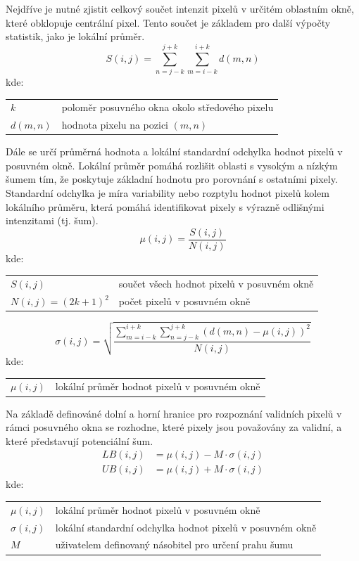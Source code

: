 \documentclass[male,czech,api_ing]{thesis}
\makeatletter
\newenvironment{conditions}[1][kde:]
    {#1 \begin{tabular}[t]{>{$}l<{$} @{${}={}$} >{\raggedright\arraybackslash}p{10cm}}}
    {\end{tabular}}
\makeatother
\begin{document}
Nejdříve je nutné zjistit celkový součet intenzit pixelů v určitém oblastním okně, které obklopuje centrální pixel. Tento součet je základem pro další výpočty statistik, jako je lokální průměr.
\begin{equation}
    S(i, j) = \sum_{n=j-k}^{j+k}\sum_{m=i-k}^{i+k} d(m, n)
\end{equation}
\begin{conditions}
    k & poloměr posuvného okna okolo středového pixelu \\
    d(m, n) & hodnota pixelu na pozici $(m, n)$
\end{conditions}

Dále se určí průměrná hodnota a lokální standardní odchylka hodnot pixelů v posuvném okně. Lokální průměr pomáhá rozlišit oblasti s vysokým a nízkým šumem tím, že poskytuje základní hodnotu pro porovnání s ostatními pixely. Standardní odchylka je míra variability nebo rozptylu hodnot pixelů kolem lokálního průměru, která pomáhá identifikovat pixely s výrazně odlišnými intenzitami (tj. šum).
\begin{equation}
    \mu(i, j) = \frac{S(i, j)}{N(i, j)}
\end{equation}
\begin{conditions}
    S(i, j) & součet všech hodnot pixelů v posuvném okně \\
    N(i, j) = (2k + 1)^2 & počet pixelů v posuvném okně
\end{conditions}

\begin{equation}
    \sigma(i, j) = \sqrt{\frac{\sum_{m=i-k}^{i+k} \sum_{n=j-k}^{j+k} (d(m, n) - \mu(i, j))^2}{N(i, j)}}
\end{equation}
\begin{conditions}
    \mu(i, j) & lokální průměr hodnot pixelů v posuvném okně
\end{conditions}

Na základě definováné dolní a horní hranice pro rozpoznání validních pixelů v rámci posuvného okna se rozhodne, které pixely jsou považovány za validní, a které představují potenciální šum.
\begin{equation}
    \begin{split}
        LB(i, j) &= \mu(i, j) - M \cdot \sigma(i, j) \\
        UB(i, j) &= \mu(i, j) + M \cdot \sigma(i, j)
    \end{split}
\end{equation}
\begin{conditions}
    \mu(i, j) & lokální průměr hodnot pixelů v posuvném okně \\
    \sigma(i, j) & lokální standardní odchylka hodnot pixelů v posuvném okně \\
    M & uživatelem definovaný násobitel pro určení prahu šumu
\end{conditions}
\end{document}
